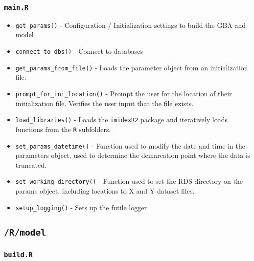 \documentclass[
]{book}
\providecommand{\tightlist}{%
  \setlength{\itemsep}{0pt}\setlength{\parskip}{0pt}}
\begin{document}
\hypertarget{main.r}{%
\subsubsection{\texorpdfstring{\texttt{main.R}}{main.R}}\label{main.r}}

\begin{itemize}
\tightlist
\item
  \texttt{get\_params()} - Configuration / Initialization settings to build the GBA and model
\item
  \texttt{connect\_to\_dbs()} - Connect to databases
\item
  \texttt{get\_params\_from\_file()} - Loads the parameter object from an initialization file.
\item
  \texttt{prompt\_for\_ini\_location()} - Prompt the user for the location of their initialization file. Verifies the user input that the file exists.
\item
  \texttt{load\_libraries()} - Loads the \texttt{imidexR2} package and iteratively loads functions from the \texttt{R} subfolders.
\item
  \texttt{set\_params\_datetime()} - Function used to modify the date and time in the parameters object, used to determine the demarcation point where the data is truncated.
\item
  \texttt{set\_working\_directory()} - Function used to set the RDS directory on the params object, including locations to X and Y dataset files.
\item
  \texttt{setup\_logging()} - Sets up the futile logger
\end{itemize}

\hypertarget{rmodel}{%
\subsection{\texorpdfstring{\texttt{/R/model}}{/R/model}}\label{rmodel}}

\hypertarget{build.r}{%
\subsubsection{\texorpdfstring{\texttt{build.R}}{build.R}}\label{build.r}}
\end{document}
